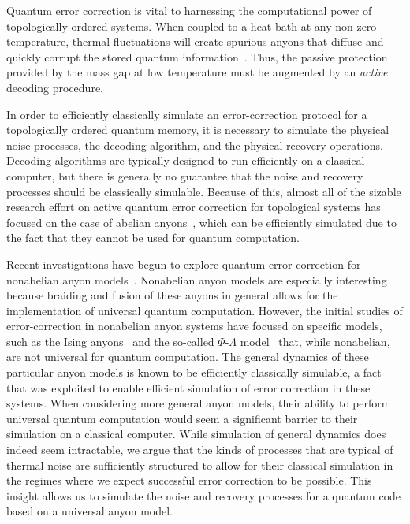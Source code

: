 \documentclass[aps, prl, letterpaper, twocolumn, superscriptaddress, notitlepage, 10pt]{revtex4-1}
\begin{document}
Quantum error correction is vital to harnessing the computational power of topologically 
ordered systems. When coupled to a heat bath at any non-zero temperature, thermal fluctuations 
will create spurious anyons that diffuse and quickly corrupt the stored quantum 
information~\cite{Pastawski2010}. Thus, the passive protection provided by the mass gap 
at low temperature must be augmented by an \emph{active} decoding procedure. 

In order to efficiently classically simulate an error-correction protocol for 
a topologically ordered quantum memory, it is necessary to simulate 
the physical noise processes, the decoding algorithm, and the physical recovery operations. 
Decoding algorithms are typically designed to run efficiently on a 
classical computer, but there is generally no guarantee that the 
noise and recovery processes should be classically simulable.
Because of this, almost all of the sizable research effort 
on active quantum error correction for topological systems has focused 
on the case of abelian anyons~\cite{Dennis2002, Duclos-Cianci2010, Duclos-Cianci2010a, Wang2010, Wang2010a, Duclos-Cianci2013, Bravyi2011, Bombin2012, Wootton2012, Anwar2014, Watson2014, Hutter2014a, Bravyi2014, Wootton2015, Fowler2015, Andrist2015}, which can be efficiently simulated due to the fact that they cannot be used for quantum computation.

Recent investigations have begun to explore quantum error correction for nonabelian anyon 
models~\cite{Brell2013, Wootton2013, Hutter2014, Wootton2015b, Hutter2015continuous}. Nonabelian anyon models are especially interesting 
because braiding and fusion of these anyons in general allows for the implementation of universal quantum 
computation. However, the initial studies of error-correction in nonabelian anyon systems have focused on specific models, such as the Ising 
anyons~\cite{Brell2013, Hutter2015continuous} and the so-called $\Phi$-$\Lambda$ 
model~\cite{Wootton2013, Hutter2014} that, while nonabelian, are not universal for quantum computation. The general dynamics of these particular anyon models is known to be efficiently classically simulable, a fact
that was exploited to enable efficient simulation of error correction 
in these systems. When considering more general anyon models, their 
ability to perform universal quantum computation would seem a significant 
barrier to their simulation on a classical computer. While simulation 
of general dynamics does indeed seem intractable, we argue that 
the kinds of processes that are typical of thermal noise 
are sufficiently structured  to allow for their classical simulation 
in the regimes where we expect successful error correction to 
be possible. This insight allows us to simulate the noise 
and recovery processes for a quantum code based on a universal anyon model.
\end{document}
